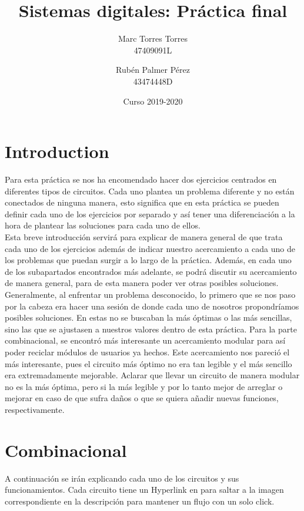 \documentclass{article}
\title{\textbf{Sistemas digitales: Práctica final}}
\author{Marc Torres Torres \\ 47409091L \and 
        Rubén Palmer Pérez \\ 43474448D }
\date{Curso 2019-2020}
\begin{document}
\maketitle
\thispagestyle{empty}
\newpage
{
\hypersetup{linkcolor=black}
\tableofcontents
}
\newpage
\section{Introduction}
Para esta práctica se nos ha encomendado hacer dos ejercicios centrados en diferentes tipos de circuitos. Cada uno plantea un problema diferente y no están conectados de ninguna manera, esto significa que en esta práctica se pueden definir cada uno de los ejercicios por separado y así tener una diferenciación a la hora de plantear las soluciones para cada uno de ellos.\\

Esta breve introducción servirá para explicar de manera general de que trata cada uno de los ejercicios además de indicar nuestro acercamiento a cada uno de los problemas que puedan surgir a lo largo de la práctica. Además, en cada uno de los subapartados encontrados más adelante, se podrá discutir su acercamiento de manera general, para de esta manera poder ver otras posibles soluciones.\\


Generalmente, al enfrentar un problema desconocido, lo primero que se nos paso por la cabeza era hacer una sesión de donde cada uno de nosotros propondríamos posibles soluciones. En estas no se buscaban la más óptimas o las más sencillas, sino las que se ajustasen a nuestros valores dentro de esta práctica. Para la parte combinacional, se encontró más interesante un acercamiento modular para así poder reciclar módulos de usuarios ya hechos. Este acercamiento nos pareció el más interesante, pues el circuito más óptimo no era tan legible y el más sencillo era extremadamente mejorable. Aclarar que llevar un circuito de manera modular no es la más óptima, pero si la más legible y por lo tanto mejor de arreglar o mejorar en caso de que sufra daños o que se quiera añadir nuevas funciones, respectivamente.

\newpage

\section{Combinacional}
A continuación se irán explicando cada uno de los circuitos y sus funcionamientos. Cada circuito tiene un Hyperlink en  para saltar a la imagen correspondiente en la descripción para mantener un flujo con un solo click. 
\end{document}
